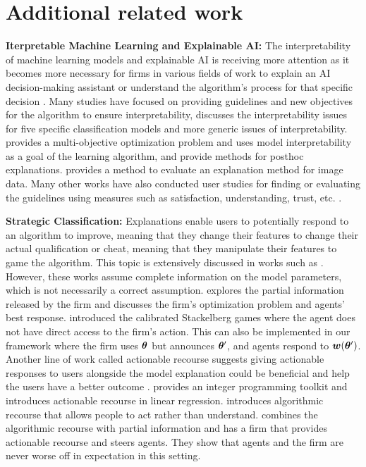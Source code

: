 \section{Additional related work}\label{sec:app-lit-review}
\textbf{Iterpretable Machine Learning and Explainable AI:} The interpretability of machine learning models and explainable AI is receiving more attention as it becomes more necessary for firms in various fields of work to explain an AI decision-making assistant or understand the algorithm's process for that specific decision \cite{ALI2023101805, peeking2018adadi}. Many studies have focused on providing guidelines and new objectives for the algorithm to ensure interpretability, \cite{freitas2014position} discusses the interpretability issues for five specific classification models and more generic issues of interpretability. \cite{lakkaraju2016decisionsets} provides a multi-objective optimization problem and uses model interpretability as a goal of the learning algorithm, \cite{lundberg2017shap} and \cite{ribeiro2016lime} provide methods for posthoc explanations. \cite{adebayo2018sanity} provides a method to evaluate an explanation method for image data. Many other works have also conducted user studies for finding or evaluating the guidelines using measures such as satisfaction, understanding, trust, etc. \cite{poursabzi2021manipulating, kulesza2015principles, sixt2022do}. 

\textbf{Strategic Classification:} Explanations enable users to potentially respond \cite{Camacho2011manipulation} to an algorithm to improve, meaning that they change their features to change their actual qualification or cheat, meaning that they manipulate their features to game the algorithm. This topic is extensively discussed in works such as \cite{Perdomo2020performative, Hardt2016strategic, Liu2020disparateequilibria, bechavod2021gaming, Hu2019disparate}. However, these works assume complete information on the model parameters, which is not necessarily a correct assumption. \cite{cohen2024bayesian} explores the partial information released by the firm and discusses the firm's optimization problem and agents' best response. \cite{haghtalab2023calibratedstackelberggameslearning} introduced the calibrated Stackelberg games where the agent does not have direct access to the firm's action. This can also be implemented in our framework where the firm uses ${\bm{\theta}}$ but announces ${\bm{\theta}}'$, and agents respond to ${\bm{w}}({\bm{\theta}}')$. Another line of work called actionable recourse suggests giving actionable responses to users alongside the model explanation could be beneficial and help the users have a better outcome \cite{karimi2022recoursesurvey}. \cite{ustun2019recourse} provides an integer programming toolkit and introduces actionable recourse in linear regression. \cite{karimi2021algorithmicrecourse} introduces algorithmic recourse that allows people to act rather than understand. \cite{harris2022bayesian} combines the algorithmic recourse with partial information and has a firm that provides actionable recourse and steers agents. They show that agents and the firm are never worse off in expectation in this setting. 